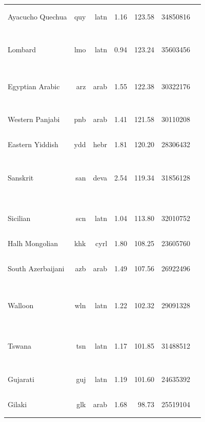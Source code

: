 \documentclass[11pt]{article}
\begin{document}
\begin{center}
\begin{longtable}[width=0.9\textwidth]{|lrrrrrl|}
Ayacucho Quechua & quy & latn & 1.16 & 123.58 & 34850816 & {\color{nllb}\rule{3.47cm}{8pt}}{\color{glot500}\rule{0.0cm}{8pt}}{\color{other}\rule{0.5299999999999998cm}{8pt}} \\ 
Lombard & lmo & latn & 0.94 & 123.24 & 35603456 & {\color{oscar}\rule{0.03cm}{8pt}}{\color{nllb}\rule{1.78cm}{8pt}}{\color{glot500}\rule{1.48cm}{8pt}}{\color{other}\rule{0.71cm}{8pt}} \\ 
Egyptian Arabic & arz & arab & 1.55 & 122.38 & 30322176 & {\color{oscar}\rule{0.33cm}{8pt}}{\color{glot500}\rule{0.29cm}{8pt}}{\color{other}\rule{3.38cm}{8pt}} \\ 
Western Panjabi & pnb & arab & 1.41 & 121.58 & 30110208 & {\color{oscar}\rule{0.28cm}{8pt}}{\color{glot500}\rule{2.05cm}{8pt}}{\color{other}\rule{1.67cm}{8pt}} \\ 
Eastern Yiddish & ydd & hebr & 1.81 & 120.20 & 28306432 & {\color{nllb}\rule{4.0cm}{8pt}} \\ 
Sanskrit & san & deva & 2.54 & 119.34 & 31856128 & {\color{oscar}\rule{0.29cm}{8pt}}{\color{nllb}\rule{1.48cm}{8pt}}{\color{madlad400}\rule{1.58cm}{8pt}}{\color{glot500}\rule{0.22cm}{8pt}}{\color{other}\rule{0.4299999999999997cm}{8pt}} \\ 
Sicilian & scn & latn & 1.04 & 113.80 & 32010752 & {\color{oscar}\rule{0.0cm}{8pt}}{\color{nllb}\rule{2.72cm}{8pt}}{\color{glot500}\rule{0.93cm}{8pt}}{\color{other}\rule{0.34999999999999964cm}{8pt}} \\ 
Halh Mongolian & khk & cyrl & 1.80 & 108.25 & 23605760 & {\color{nllb}\rule{4.0cm}{8pt}} \\ 
South Azerbaijani & azb & arab & 1.49 & 107.56 & 26922496 & {\color{oscar}\rule{0.46cm}{8pt}}{\color{nllb}\rule{1.84cm}{8pt}}{\color{glot500}\rule{0.0cm}{8pt}}{\color{other}\rule{1.6999999999999997cm}{8pt}} \\ 
Walloon & wln & latn & 1.22 & 102.32 & 29091328 & {\color{oscar}\rule{0.01cm}{8pt}}{\color{madlad400}\rule{0.5cm}{8pt}}{\color{glot500}\rule{3.27cm}{8pt}}{\color{other}\rule{0.21999999999999975cm}{8pt}} \\ 
Tswana & tsn & latn & 1.17 & 101.85 & 31488512 & {\color{nllb}\rule{2.17cm}{8pt}}{\color{madlad400}\rule{0.73cm}{8pt}}{\color{glot500}\rule{1.03cm}{8pt}}{\color{other}\rule{0.07000000000000028cm}{8pt}} \\ 
Gujarati & guj & latn & 1.19 & 101.60 & 24635392 & {\color{madlad400}\rule{0.01cm}{8pt}}{\color{glot500}\rule{3.99cm}{8pt}} \\ 
Gilaki & glk & arab & 1.68 & 98.73 & 25519104 & {\color{glot500}\rule{1.95cm}{8pt}}{\color{other}\rule{2.05cm}{8pt}} \\ 

\end{longtable}
\end{center}
\end{document}

